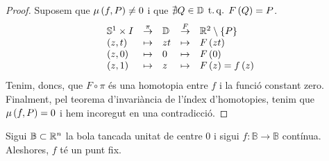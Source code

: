 \begin{proof}
	Suposem que $\mu\left( f, P \right) \neq 0$ i que $\nexists Q \in \mathbb{D} \operatorname{\;t.q.\;} F\left( Q\right) = P$.
	\[
		\begin{array}{lclcl}
			\mathbb{S}^1 \times I & \stackrel{\pi}{\to} & \mathbb{D} & \stackrel{F}{\to} & \mathbb{R} ^2 \setminus \left\{ P \right\} \\
			\left( z, t \right) & \mapsto & zt & \mapsto & F\left( zt \right) \\
			\left( z, 0 \right) & \mapsto & 0 & \mapsto & F\left( 0 \right)\\
			\left( z, 1 \right) & \mapsto & z & \mapsto & F\left( z \right) = f\left( z \right)
		\end{array}
	\]
	Tenim, doncs, que $F \circ \pi$ és una homotopia entre $f$ i la funció constant zero. Finalment, pel teorema d'invariància de l'índex d'homotopies, tenim que $\mu \left( f, P \right) = 0$ i hem incoregut en una contradicció.
\end{proof}

\begin{teo*}
	Sigui $\mathbb{B}\subset \mathbb{R} ^n$ la bola tancada unitat de centre $0$ i sigui $f\colon \mathbb{B} \to \mathbb{B}$ contínua. Aleshores, $f$ té un punt fix.
\end{teo*}

